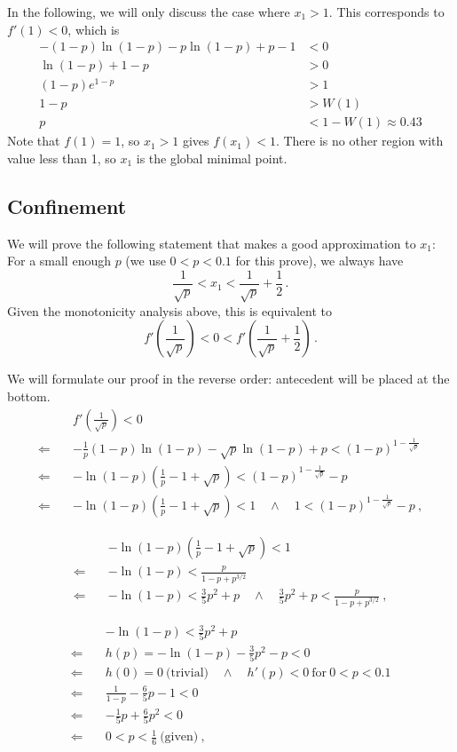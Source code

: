 \documentclass[]{article}
\begin{document}
In the following, we will only discuss the case where $x_1 > 1$. This corresponds to $f'(1) < 0$, which is
\begin{align*}
-(1-p)\ln(1-p) - p\ln(1-p) + p - 1  &< 0\\
 \ln(1-p) + 1-p &> 0\\
 (1 - p)e^{1-p} &> 1\\
 1 - p &>W(1)\\
 p &<1-W(1)\approx 0.43
\end{align*}
Note that $f(1) = 1$, so $x_1 > 1$ gives $f(x_1) < 1$. There is no other region with value less than 1, so $x_1$ is the global minimal point.

\subsection{Confinement}
We will prove the following statement that makes a good approximation to $x_1$:\\
For a small enough $p$ (we use $0 < p < 0.1$ for this prove), we always have \[\frac{1}{\sqrt{p}} < x_1 < \frac{1}{\sqrt{p}} + \frac{1}{2}\,.\]
Given the monotonicity analysis above, this is equivalent to\\ \[f'\left(\frac{1}{\sqrt{p}}\right) < 0 < f'\left(\frac{1}{\sqrt{p}} + \frac{1}{2}\right)\,.\]

We will formulate our proof in the reverse order: antecedent will be placed at the bottom.
\begin{align*}
&f'\left(\frac{1}{\sqrt{p}}\right) < 0\\
\Longleftarrow\quad&-\frac{1}{p}(1-p)\ln(1-p) - \sqrt{p}\ln(1-p) + p < (1-p)^{1-\frac{1}{\sqrt{p}}}\\
\Longleftarrow\quad&-\ln(1-p)\left(\frac{1}{p} - 1 + \sqrt{p}\right)< (1-p)^{1-\frac{1}{\sqrt{p}}} - p\\
\Longleftarrow\quad&-\ln(1-p)\left(\frac{1}{p} - 1 + \sqrt{p}\right)< 1\quad\wedge\quad 1 < (1-p)^{1-\frac{1}{\sqrt{p}}} - p\ ,
\end{align*}

\begin{align*}
&-\ln(1-p)\left(\frac{1}{p} - 1 + \sqrt{p}\right)< 1\\
\Longleftarrow\quad& -\ln(1-p) < \frac{p}{1 - p + p^{3/2}}\\
\Longleftarrow\quad& -\ln(1-p) < \frac{3}{5}p^2+p\quad\wedge\quad\frac{3}{5}p^2+p < \frac{p}{1 - p + p^{3/2}}\ ,
\end{align*}

\begin{align*}
& -\ln(1-p) < \frac{3}{5}p^2+p\\
\Longleftarrow\quad&h(p) = -\ln(1-p) - \frac{3}{5}p^2 - p < 0\\
\Longleftarrow\quad&h(0) = 0\ \mbox{(trivial)} \quad\wedge\quad h'(p) < 0\ \mbox{for}\ 0 < p < 0.1\\
\Longleftarrow\quad&\frac{1}{1-p} -  \frac{6}{5}p - 1 < 0\\
\Longleftarrow\quad&-\frac{1}{5}p + \frac{6}{5}p^2  < 0 \\
\Longleftarrow\quad& 0 < p < \frac{1}{6} \ \mbox{(given)}\ ,
\end{align*}
\end{document}
